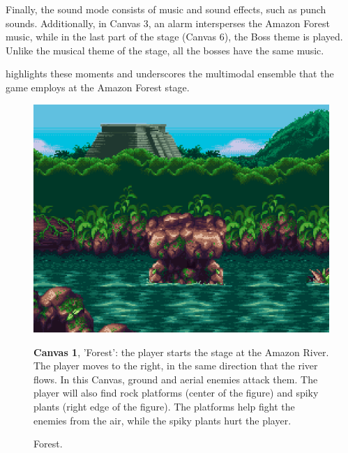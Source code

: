 \documentclass[english]{textolivre}
\begin{document}
Finally, the sound mode consists of music and sound effects, such as punch sounds. Additionally, in Canvas 3, an alarm intersperses the Amazon Forest music, while in the last part of the stage (Canvas 6), the Boss theme is played. Unlike the musical theme of the stage, all the bosses have the same music.

highlights these moments and underscores the multimodal ensemble that the game employs at the Amazon Forest stage.

\begin{figure}[htbp]
\begin{minipage}[t]{.47\textwidth}
\vspace{0pt}
\includegraphics[width=\textwidth]{fig-4.png}
\caption{Forest.}
\label{fig-4}
\end{minipage}
\hfill
\begin{minipage}[t]{.47\textwidth}
\vspace{2pt}
\textbf{Canvas 1}, 'Forest': the player starts the stage at the Amazon River. The player moves to the right, in the same direction that the river flows. In this Canvas, ground and aerial enemies attack them. The player will also find rock platforms (center of the figure) and spiky plants (right edge of the figure). The platforms help fight the enemies from the air, while the spiky plants hurt the player.
\end{minipage}
\end{figure}
\end{document}

